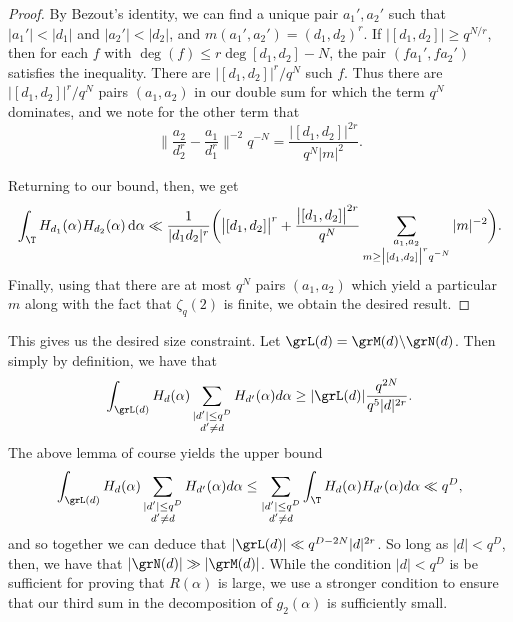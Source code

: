 \documentclass[reqno,11pt]{amsart}
\theoremstyle{definition}
\theoremstyle{remark}
\numberwithin{equation}{section}
\def\setmin{{\setminus\!\,}}
\renewcommand{\d}{\,{\rm d}} %
\newcommand{\<}{\begin{equation}}
\renewcommand{\>}{\end{equation}}
\begin{document}
\begin{proof}
    By Bezout's identity, we can find a unique pair $a_1',a_2'$ such that $|a_1'|<|d_1|$ and $|a_2'|<|d_2|$, and $m(a_1',a_2') = (d_1,d_2)^r$. If $|[d_1,d_2]|\geq q^{N/r}$, then for each $f$ with $\deg(f) \leq r\deg[d_1,d_2]-N$, the pair $(fa_1',fa_2')$ satisfies the inequality. There are $\big|[d_1,d_2]\big|^r/q^N$ such $f$. Thus there are $\big|[d_1,d_2]\big|^r/q^N$ pairs $(a_1,a_2)$ in our double sum for which the term $q^N$ dominates, and we note for the other term that
    \[\bigg\|\dfrac{a_2}{d_2^r}-\dfrac{a_1}{d_1^r}\bigg\|^{-2}q^{-N} = \dfrac{\big|[d_1,d_2]\big|^{2r}}{q^N|m|^2}.\]
    
    Returning to our bound, then, we get
    \[\int_\T H_{d_1}(\alpha)H_{d_2}(\alpha)\d\alpha \ll \dfrac{1}{|d_1d_2|^r}\bigg(\big|[d_1,d_2]\big|^r+\dfrac{\big|[d_1,d_2]\big|^{2r}}{q^N}\sum_{\substack{a_1,a_2 \\ m\geq\big|[d_1,d_2]\big|^rq^{-N}}}|m|^{-2}\bigg).\]
    Finally, using that there are at most $q^N$ pairs $(a_1,a_2)$ which yield a particular $m$ along with the fact that $\zeta_q(2)$ is finite, we obtain the desired result.
\end{proof}

This gives us the desired size constraint. Let $\grL(d) = \grM(d)\setmin \grN(d)$. Then simply by definition, we have that
\[\int_{\grL(d)} H_d(\alpha)\sum_{\substack{|d'| \leq q^D \\ d' \neq d}}H_{d'}(\alpha) d\alpha \geq |\grL(d)|\dfrac{q^{2N}}{q^5|d|^{2r}}.\]
The above lemma of course yields the upper bound
\[\int_{\grL(d)} H_d(\alpha)\sum_{\substack{|d'| \leq q^D \\ d' \neq d}}H_{d'}(\alpha) d\alpha \leq \sum_{\substack{|d'| \leq q^D \\ d' \neq d}} \int_\T H_d(\alpha)H_{d'}(\alpha)d\alpha \ll q^D,\]
and so together we can deduce that $|\grL(d)| \ll q^{D-2N}|d|^{2r}$. So long as $|d|<q^D$, then, we have that $|\grN(d)| \gg |\grM(d)|$. While the condition $|d|<q^D$ is be sufficient for proving that $R(\alpha)$ is large, we use a stronger condition to ensure that our third sum in the decomposition of $g_2(\alpha)$ is sufficiently small. 
\end{document}
